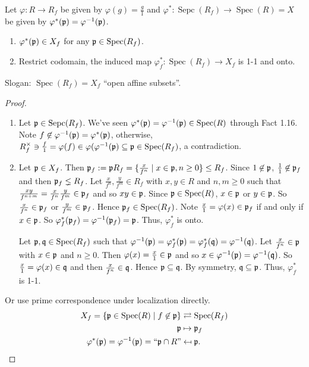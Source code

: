 \begin{proposition}
    Let $\varphi: R \to R_f$ be given by $\varphi(g) = \frac{g}{1}$ and $\varphi^*: \operatorname{Sepc}(R_f) \to \operatorname{Spec}(R) = X$ be given by $\varphi^*(\mathfrak{p}) = \varphi^{-1}(\mathfrak{p})$.
    \begin{enumerate}
        \item $\varphi^*(\mathfrak{p}) \in X_f$ for any $\mathfrak{p} \in \operatorname{Spec}(R_f)$. 
        \item Restrict codomain, the induced map $\varphi_f^*: \operatorname{Spec}(R_f) \to X_f$ is 1-1 and onto.
    \end{enumerate}
    Slogan: $\operatorname{Spec}(R_f) = X_f$ ``open affine subsets''.
\end{proposition}

\begin{proof}
    \begin{enumerate}
        \item Let $\mathfrak{p} \in \operatorname{Sepc}(R_f)$. We've seen $\varphi^*(\mathfrak{p}) = \varphi^{-1}(\mathfrak{p}) \in \operatorname{Spec}(R)$ through Fact 1.16. Note $f \not \in \varphi^{-1}(\mathfrak{p}) = \varphi^*(\mathfrak{p})$, otherwise, $R_f^\times \ni \frac{f}{1} = \varphi(f) \in \varphi(\varphi^{-1}(\mathfrak{p}) \subseteq \mathfrak{p} \in \operatorname{Spec}(R_f)$, a contradiction. 
        \item 
            Let $\mathfrak{p} \in X_f$. Then $\mathfrak{p}_f := \mathfrak{p} R_f = \{\frac{x}{f^n} \mid x \in \mathfrak{p}, n \geq 0\} \leq R_f$. Since $1 \not \in \mathfrak{p}$, $\frac{1}{1} \not \in \mathfrak{p}_f$ and then $\mathfrak{p}_f \lneq R_f$. Let $\frac{x}{f^n},\frac{y}{f^m} \in R_f$ with $x,y \in R$ and $n,m \geq 0$ such that $\frac{xy}{f^{n+m}} = \frac{x}{f^n} \frac{y}{f^m} \in \mathfrak{p}_f$ and so $xy \in \mathfrak{p}$. Since $\mathfrak{p} \in \operatorname{Spec}(R)$, $x \in \mathfrak{p}$ or $y \in \mathfrak{p}$. So $\frac{x}{f^n} \in \mathfrak{p}_f$ or $\frac{y}{f^m} \in \mathfrak{p}_f$. Hence $\mathfrak{p}_f \in \operatorname{Spec}(R_f)$. Note $\frac{x}{1} = \varphi(x) \in \mathfrak{p}_f$ if and only if $x \in \mathfrak{p}$. So $\varphi_f^*(\mathfrak{p}_f) = \varphi^{-1}(\mathfrak{p}_f) = \mathfrak{p}$. Thus, $\varphi_f^*$ is onto. \par 
            Let $\mathfrak{p}, \mathfrak{q} \in \operatorname{Spec}(R_f)$ such that $\varphi^{-1}(\mathfrak{p}) = \varphi^*_f(\mathfrak{p}) = \varphi_f^*(\mathfrak{q}) = \varphi^{-1}(\mathfrak{q})$. Let $\frac{x}{f^n} \in \mathfrak{p}$ with $x \in \mathfrak{p}$ and $n \geq 0$. Then $\varphi(x) = \frac{x}{1} \in \mathfrak{p}$ and so $x \in \varphi^{-1}(\mathfrak{p}) = \varphi^{-1}(\mathfrak{q})$. So $\frac{x}{1} = \varphi(x) \in \mathfrak{q}$ and then $\frac{x}{f^n} \in \mathfrak{q}$. Hence $\mathfrak{p} \subseteq \mathfrak{q}$. By symmetry, $\mathfrak{q} \subseteq \mathfrak{p}$. Thus, $\varphi_f^*$ is 1-1.
    \end{enumerate}
    Or use prime correspondence under localization directly. 
    \begin{align*}
        X_f = \{\mathfrak{p} \in \operatorname{Spec}(R) \mid f \not \in \mathfrak{p}\} & \rightleftarrows \operatorname{Spec}(R_f) \\
        \mathfrak{p} &\mapsto \mathfrak{p}_f \\ 
        \varphi^*(\mathfrak{p}) = \varphi^{-1}(\mathfrak{p}) = \text{``$\mathfrak{p} \cap R$''} &\mapsfrom \mathfrak{p}. \qedhere
    \end{align*}


\end{proof}

